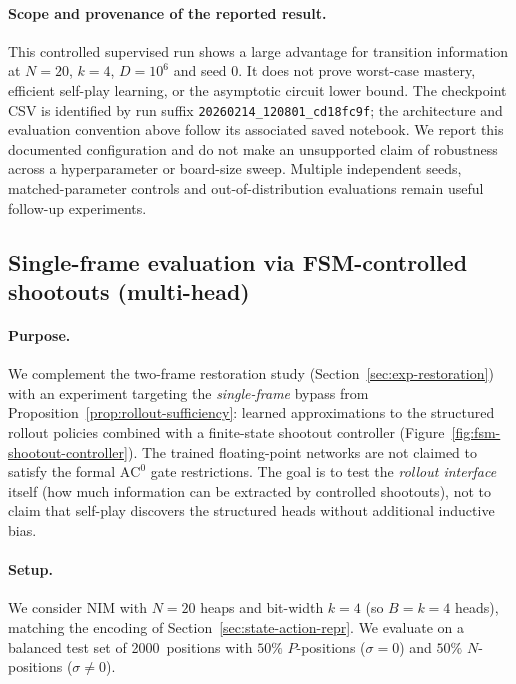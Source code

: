 \documentclass[twoside,11pt]{article}
\newcommand{\AC}{\mathrm{AC}}
\numberwithin{theorem}{section}
\numberwithin{equation}{section}
\begin{document}
\paragraph{Scope and provenance of the reported result.}
This controlled supervised run shows a large advantage for transition information at $N=20$, $k=4$, $D=10^6$ and seed 0. It does not prove worst-case mastery, efficient self-play learning, or the asymptotic circuit lower bound. The checkpoint CSV is identified by run suffix \texttt{20260214\_120801\_cd18fc9f}; the architecture and evaluation convention above follow its associated saved notebook.
We report this documented configuration and do not make an unsupported claim of robustness across a hyperparameter or board-size sweep. Multiple independent seeds, matched-parameter controls and out-of-distribution evaluations remain useful follow-up experiments.

\subsection{Single-frame evaluation via FSM-controlled shootouts (multi-head)}
\label{sec:exp-fsm-shootout}

\paragraph{Purpose.}
We complement the two-frame restoration study (Section~\ref{sec:exp-restoration}) with an experiment targeting the \emph{single-frame} bypass from Proposition~\ref{prop:rollout-sufficiency}:
learned approximations to the structured rollout policies combined with a finite-state shootout controller (Figure~\ref{fig:fsm-shootout-controller}). The trained floating-point networks are not claimed to satisfy the formal $\AC^0$ gate restrictions.
The goal is to test the \emph{rollout interface} itself (how much information can be extracted by controlled shootouts), not to claim that self-play discovers the structured heads without additional inductive bias.

\paragraph{Setup.}
We consider NIM with $N=20$ heaps and bit-width $k=4$ (so $B=k=4$ heads), matching the encoding of Section~\ref{sec:state-action-repr}.
We evaluate on a balanced test set of 2000~positions with $50\%$ $P$-positions ($\sigma=0$) and $50\%$ $N$-positions ($\sigma\neq 0$).
\end{document}
